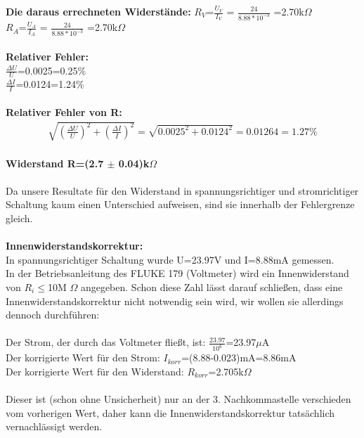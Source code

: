 \documentclass{article}
\begin{document}
\textbf{Die daraus errechneten Widerstände:}
$R_V$=$\frac{U_V}{I_V}$ = $\frac{24}{8.88*10^{-3}}$ =2.70k$\Omega$\\
$R_A$=$\frac{U_A}{I_A}$ = $\frac{24}{8.88*10^{-3}}$ =2.70k$\Omega$\\
\\
\textbf{Relativer Fehler:}\\
$\frac{\Delta U}{U}$=0.0025=0.25\%\\
$\frac{\Delta I}{I}$=0.0124=1.24\%\\
\\
\textbf{Relativer Fehler von R:}\\
\begin{gather}
\sqrt{(\frac{\Delta U}{U})^2+(\frac{\Delta I}{I})^2 }=\sqrt{0.0025^2+0.0124^2}=0.01264=1.27\%
\end{gather}
\\
\textbf{Widerstand R=(2.7 $\pm$ 0.04)k$\Omega$}\\
\\
Da unsere Resultate für den Widerstand in spannungsrichtiger und stromrichtiger Schaltung kaum einen Unterschied aufweisen, sind sie innerhalb der Fehlergrenze gleich.\\
\\
\textbf{Innenwiderstandskorrektur:}\\
In spannungsrichtiger Schaltung wurde U=23.97V und I=8.88mA gemessen.\\
In der Betriebsanleitung des FLUKE 179 (Voltmeter) wird ein Innenwiderstand von $R_i$$ \le $10M
$\Omega$ angegeben. Schon diese Zahl lässt darauf schließen, dass eine Innenwiderstandskorrektur nicht notwendig sein wird, wir wollen sie allerdings dennoch durchführen: \\
\\
Der Strom, der durch das Voltmeter fließt, ist: $\frac{23.97}{10^6}$=23.97$\mu$A\\
Der korrigierte Wert für den Strom: $I_{korr}$=(8.88-0.023)mA=8.86mA\\
Der korrigierte Wert für den Widerstand: $R_{korr}$=2.705k$\Omega$\\
\\
Dieser ist (schon ohne Unsicherheit) nur an der 3. Nachkommastelle verschieden vom vorherigen Wert, daher kann die Innenwiderstandskorrektur tatsächlich vernachlässigt werden.\\
\\
\end{document}
